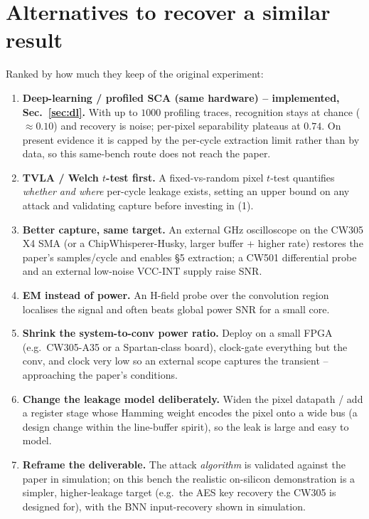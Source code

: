 \documentclass[10pt]{article}
\begin{document}
\section{Alternatives to recover a similar result}\label{sec:alt}
Ranked by how much they keep of the original experiment:
\begin{enumerate}
\item \textbf{Deep-learning / profiled SCA (same hardware) -- implemented, Sec.~\ref{sec:dl}.}
With up to $1000$ profiling traces, recognition stays at chance ($\approx\!0.10$) and
recovery is noise; per-pixel separability plateaus at $0.74$. On present evidence it is
capped by the per-cycle extraction limit rather than by data, so this same-bench route does
not reach the paper.
\item \textbf{TVLA / Welch $t$-test first.} A fixed-vs-random pixel $t$-test
quantifies \emph{whether and where} per-cycle leakage exists, setting an upper bound on any
attack and validating capture before investing in (1).
\item \textbf{Better capture, same target.} An external GHz oscilloscope on the CW305 X4
SMA (or a ChipWhisperer-Husky, larger buffer + higher rate) restores the paper's
samples/cycle and enables §5 extraction; a CW501 differential probe and an external
low-noise VCC-INT supply raise SNR.
\item \textbf{EM instead of power.} An H-field probe over the convolution region localises
the signal and often beats global power SNR for a small core.
\item \textbf{Shrink the system-to-conv power ratio.} Deploy on a small FPGA (e.g.\
CW305-A35 or a Spartan-class board), clock-gate everything but the conv, and clock very low
so an external scope captures the transient -- approaching the paper's conditions.
\item \textbf{Change the leakage model deliberately.} Widen the pixel datapath / add a
register stage whose Hamming weight encodes the pixel onto a wide bus (a design change
within the line-buffer spirit), so the leak is large and easy to model.
\item \textbf{Reframe the deliverable.} The attack \emph{algorithm} is validated against
the paper in simulation; on this bench the realistic on-silicon demonstration is a simpler,
higher-leakage target (e.g.\ the AES key recovery the CW305 is designed for), with the BNN
input-recovery shown in simulation.
\end{enumerate}
\end{document}
